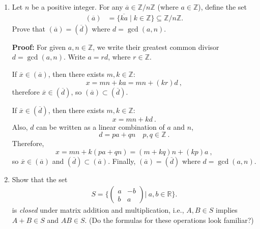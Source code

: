 \documentclass[12pt]{article}
\newcommand{\Z}{\mathbb{Z}}
\begin{document}
\begin{enumerate}
\newpage
\item Let $n$ be a positive integer. For any $\overline{a}\in\Z/n\Z$ (where $a\in\Z$), define the set
\begin{align*}
( \overline{a} ) &= \{\overline{ka} \mid k \in \mathbb{Z}\} \subseteq \Z/n\Z.
\end{align*}
Prove that $( \overline{a} ) = ( \overline{d} )$ where $d=\gcd(a,n)$.

\smallskip
{\bf Proof:} For given $a, n \in \Z$, we write their greatest common divisor $d = \gcd(a,n)$.
Write $a = r d$, where $r \in \Z$.

If $\overline{x} \in (\overline{a})$, then there exists $m ,k \in \Z$:
$$
x = m n + k a = m n + (k r) d~,
$$
therefore $\overline{x} \in (\overline{d})$, so $(\overline{a}) \subset (\overline{d})$.

If $\overline{x} \in (\overline{d})$, then there exists $m, k \in \Z$:
$$
x = mn + k d~.
$$
Also, $d$ can be written as a linear combination of $a$ and $n$,
$$
d = p a + q n \quad p,q \in \Z~.
$$
Therefore,
$$
x = mn + k(pa + qn) = (m + kq) n + (kp) a~,
$$
so $\overline{x} \in (\overline{a})$ and $(\overline{d}) \subset (\overline{a})$. Finally, $(\overline{a}) = (\overline{d})$ where $d = \gcd(a,n)$.

\newpage

\item Show that the set
\begin{align*}
S=\Big\{\begin{pmatrix}
a & -b \\
b & a
\end{pmatrix} {\Big|}\ a,b\in \mathbb{R}\Big\}.
\end{align*}
is {\em closed} under matrix addition and multiplication, i.e., $A,B\in S$ implies $A+B\in S$ and $AB\in S$. (Do the formulas for these operations look familiar?)


\end{enumerate}
\end{document}
